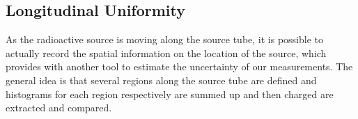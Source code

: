 

\subsection{Longitudinal Uniformity}
As the radioactive source is moving along the source tube, it is possible to actually record the spatial information on the location of the source, which provides with another tool to estimate the uncertainty of our measurements. The general idea is that several regions along the source tube are defined and histograms for each region respectively are summed up and then charged are extracted and compared.

